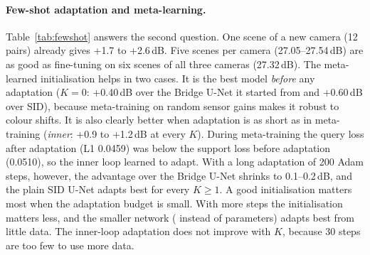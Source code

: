\paragraph{Few-shot adaptation and meta-learning.} Table~\ref{tab:fewshot} answers the second question. One scene of a new camera (12 pairs) already gives +1.7 to +2.6\,dB. Five scenes per camera (27.05--27.54\,dB) are as good as fine-tuning on six scenes of all three cameras (27.32\,dB). The meta-learned initialisation helps in two cases. It is the best model \emph{before} any adaptation ($K=0$: +0.40\,dB over the Bridge U-Net it started from and +0.60\,dB over SID), because meta-training on random sensor gains makes it robust to colour shifts. It is also clearly better when adaptation is as short as in meta-training (\emph{inner}: +0.9 to +1.2\,dB at every $K$). During meta-training the query loss after adaptation (L1 0.0459) was below the support loss before adaptation (0.0510), so the inner loop learned to adapt. With a long adaptation of 200 Adam steps, however, the advantage over the Bridge U-Net shrinks to 0.1--0.2\,dB, and the plain SID U-Net adapts best for every $K\ge1$. A good initialisation matters most when the adaptation budget is small. With more steps the initialisation matters less, and the smaller network (\PSID{} instead of \PBRIDGE{} parameters) adapts best from little data. The inner-loop adaptation does not improve with $K$, because 30 steps are too few to use more data.

